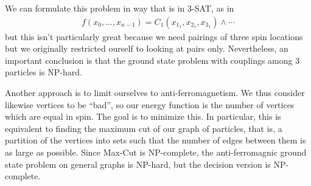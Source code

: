 \documentclass{article}
\begin{document}
We can formulate this problem in way that is in 3-SAT, as in
\begin{align*}
    f(x_0, \ldots, x_{n - 1}) = C_1(x_{1_1}, x_{2_1}, x_{3_1}) \land \cdots
\end{align*}
but this isn't particularly great because we need pairings of three spin locations but we originally restricted ourself to looking at pairs only. Nevertheless, an important conclusion is that the ground state problem with couplings among 3 particles is NP-hard.

Another approach is to limit ourselves to anti-ferromagnetism. We thus consider likewise vertices to be \enquote{bad}, so our energy function is the number of vertices which are equal in spin. The goal is to minimize this. In particular, this is equivalent to finding the maximum cut of our graph of particles, that is, a partition of the vertices into sets such that the number of edges between them is as large as possible. Since Max-Cut is NP-complete, the anti-ferromagnic ground state problem on general graphs is NP-hard, but the decision version is NP-complete.
\end{document}
